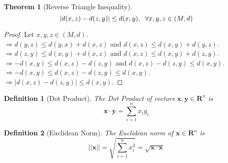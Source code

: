 \documentclass{article}
\newtheorem{definition}{Definition}[section]
\newtheorem{theorem}{Theorem}[section]
\begin{document}
			\begin{theorem}[Reverse Triangle Inequality]
			\label{reverse-triangle-inequality}
			$$|d(x, z) - d(z, y)| \leq d(x, y), \hspace{2 mm} \forall x, y, z \in (M, d)$$
			\end{theorem}
			\begin{proof}
				Let $x, y, z \in (M, d)$. \\
				$\Rightarrow d(y, z) \leq d(y, x) + d(x, z)$ and $d(x, z) \leq d(x, y) + d(y, z)$. \\
				$\Rightarrow d(z, y) \leq d(x, y) + d(x, z)$ and $d(x, z) \leq d(x, y) + d(z, y)$. \\
				$\Rightarrow -d(x, y) \leq d(x, z) - d(z, y)$ and $d(x, z) - d(z, y) \leq d(x, y)$. \\
				$\Rightarrow -d(x, y) \leq d(x, z) - d(z, y) \leq d(x, y)$. \\
				$\Rightarrow |d(x, z) - d(z, y)| \leq d(x, y)$.
			\end{proof}

			\begin{definition}[Dot Product]
				The Dot Product of vectors $\bm{x}, \bm{y} \in \mathbf{R}^n$ is $$\bm{x} \cdot \bm{y} = \sum\limits_{i=1}^n x_i y_i$$
			\end{definition}

			\begin{definition}[Euclidean Norm]
				The Euclidean norm of $\bm{x} \in \mathbf{R}^n$ is $$||\bm{x}|| = \sqrt{\sum\limits_{i=1}^n x_i^2} = \sqrt{\bm{x} \cdot \bm{x}}$$
			\end{definition}
\end{document}
